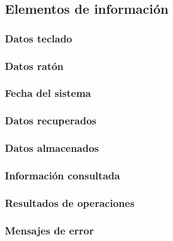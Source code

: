 \subsection{Elementos de información}

  \subsubsection{Datos teclado}

  

  \subsubsection{Datos ratón}

  

  \subsubsection{Fecha del sistema}

  

  \subsubsection{Datos recuperados}

  

  \subsubsection{Datos almacenados}

  

  \subsubsection{Información consultada}

  

  \subsubsection{Resultados de operaciones}

  

  \subsubsection{Mensajes de error}

  